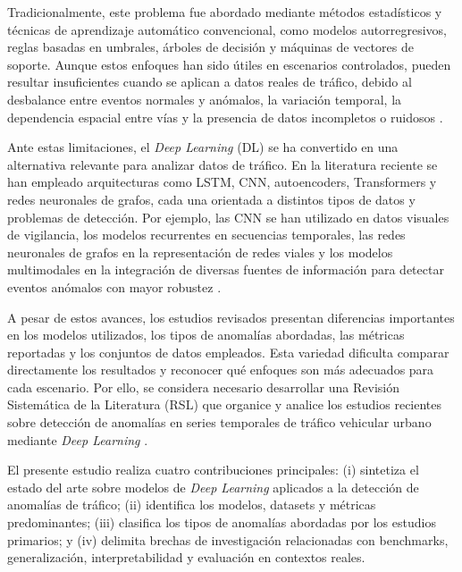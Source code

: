 \documentclass[12pt, a4paper]{article}
\begin{document}
Tradicionalmente, este problema fue abordado mediante m\'{e}todos estad\'{i}sticos y t\'{e}cnicas de aprendizaje autom\'{a}tico convencional, como modelos autorregresivos, reglas basadas en umbrales, \'{a}rboles de decisi\'{o}n y m\'{a}quinas de vectores de soporte. Aunque estos enfoques han sido \'{u}tiles en escenarios controlados, pueden resultar insuficientes cuando se aplican a datos reales de tr\'{a}fico, debido al desbalance entre eventos normales y an\'{o}malos, la variaci\'{o}n temporal, la dependencia espacial entre v\'{i}as y la presencia de datos incompletos o ruidosos \cite{fang2020deep}.

Ante estas limitaciones, el \textit{Deep Learning} (DL) se ha convertido en una alternativa relevante para analizar datos de tr\'{a}fico. En la literatura reciente se han empleado arquitecturas como LSTM, CNN, autoencoders, Transformers y redes neuronales de grafos, cada una orientada a distintos tipos de datos y problemas de detecci\'{o}n. Por ejemplo, las CNN se han utilizado en datos visuales de vigilancia, los modelos recurrentes en secuencias temporales, las redes neuronales de grafos en la representaci\'{o}n de redes viales y los modelos multimodales en la integraci\'{o}n de diversas fuentes de informaci\'{o}n para detectar eventos an\'{o}malos con mayor robustez \cite{duan2025multimodal}.

A pesar de estos avances, los estudios revisados presentan diferencias importantes en los modelos utilizados, los tipos de anomal\'{i}as abordadas, las m\'{e}tricas reportadas y los conjuntos de datos empleados. Esta variedad dificulta comparar directamente los resultados y reconocer qu\'{e} enfoques son m\'{a}s adecuados para cada escenario. Por ello, se considera necesario desarrollar una Revisi\'{o}n Sistem\'{a}tica de la Literatura (RSL) que organice y analice los estudios recientes sobre detecci\'{o}n de anomal\'{i}as en series temporales de tr\'{a}fico vehicular urbano mediante \textit{Deep Learning} \cite{Kitchenham2007}.

El presente estudio realiza cuatro contribuciones principales: (i) sintetiza el estado del arte sobre modelos de \textit{Deep Learning} aplicados a la detecci\'{o}n de anomal\'{i}as de tr\'{a}fico; (ii) identifica los modelos, datasets y m\'{e}tricas predominantes; (iii) clasifica los tipos de anomal\'{i}as abordadas por los estudios primarios; y (iv) delimita brechas de investigaci\'{o}n relacionadas con benchmarks, generalizaci\'{o}n, interpretabilidad y evaluaci\'{o}n en contextos reales.
\end{document}
